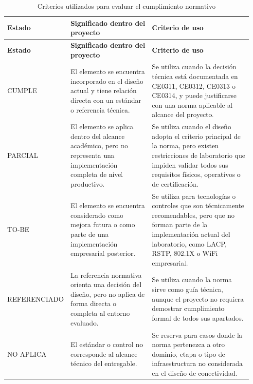 \documentclass[11pt, a4paper, oneside]{report}
\begin{document}
\begin{xltabular}{\textwidth}{@{}|L{2.8cm}|X|X|@{}}
\caption{Criterios utilizados para evaluar el cumplimiento normativo}
\label{tab:criterios_evaluacion_cumplimiento} \\

\parbox[c][1.1cm][c]{\linewidth}{\centering\color{white}\bfseries\small Estado} &
\parbox[c][1.1cm][c]{\linewidth}{\centering\color{white}\bfseries\small Significado dentro del proyecto} &
\parbox[c][1.1cm][c]{\linewidth}{\centering\color{white}\bfseries\small Criterio de uso} \\ \hline
\endfirsthead

\parbox[c][1.1cm][c]{\linewidth}{\centering\color{white}\bfseries\small Estado} &
\parbox[c][1.1cm][c]{\linewidth}{\centering\color{white}\bfseries\small Significado dentro del proyecto} &
\parbox[c][1.1cm][c]{\linewidth}{\centering\color{white}\bfseries\small Criterio de uso} \\ \hline
\endhead

\hline
\endfoot

{\small CUMPLE} &
{\small El elemento se encuentra incorporado en el diseño actual y tiene relación directa con un estándar o referencia técnica.} &
{\small Se utiliza cuando la decisión técnica está documentada en CE0311, CE0312, CE0313 o CE0314, y puede justificarse con una norma aplicable al alcance del proyecto.} \\ \hline

{\small PARCIAL} &
{\small El elemento se aplica dentro del alcance académico, pero no representa una implementación completa de nivel productivo.} &
{\small Se utiliza cuando el diseño adopta el criterio principal de la norma, pero existen restricciones de laboratorio que impiden validar todos sus requisitos físicos, operativos o de certificación.} \\ \hline

{\small TO-BE} &
{\small El elemento se encuentra considerado como mejora futura o como parte de una implementación empresarial posterior.} &
{\small Se utiliza para tecnologías o controles que son técnicamente recomendables, pero que no forman parte de la implementación actual del laboratorio, como LACP, RSTP, 802.1X o WiFi empresarial.} \\ \hline

{\small REFERENCIADO} &
{\small La referencia normativa orienta una decisión del diseño, pero no aplica de forma directa o completa al entorno evaluado.} &
{\small Se utiliza cuando la norma sirve como guía técnica, aunque el proyecto no requiera demostrar cumplimiento formal de todos sus apartados.} \\ \hline

{\small NO APLICA} &
{\small El estándar o control no corresponde al alcance técnico del entregable.} &
{\small Se reserva para casos donde la norma pertenezca a otro dominio, etapa o tipo de infraestructura no considerada en el diseño de conectividad.} \\ \hline

\end{xltabular}
\end{document}

